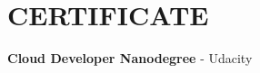 \documentclass[a4paper,12pt]{article}
\begin{document}
\section{CERTIFICATE}
\textbf{Cloud Developer Nanodegree} - Udacity

\vfill
{}
\end{document}
